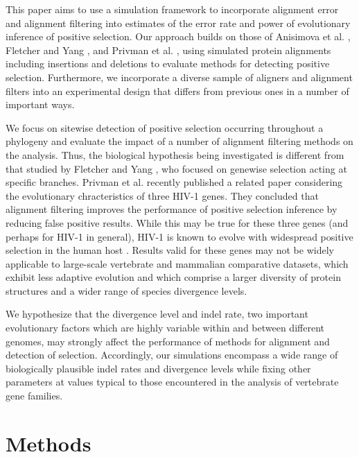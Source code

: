 \documentclass{article}
\begin{document}
This paper aims to use a simulation framework to incorporate alignment
error and alignment filtering into estimates of the error rate and
power of \sw evolutionary inference of positive selection. Our
approach builds on those of Anisimova et al.
\citeyearpar{Anisimova2002Accuracy}, Fletcher and Yang
\citeyearpar{Fletcher2010Effect}, and Privman et
al. \citeyearpar{Privman2011Improving}, using simulated protein
alignments including insertions and deletions to evaluate methods for
detecting \sw positive selection. Furthermore, we incorporate a
diverse sample of aligners and alignment filters into an experimental
design that differs from previous ones in a number of important ways.

We focus on sitewise detection of positive selection occurring
throughout a phylogeny and evaluate the impact of a number of
alignment filtering methods on the \sw analysis. Thus, the biological
hypothesis being investigated is different from that studied by
Fletcher and Yang \citeyearpar{Fletcher2010Effect}, who focused on
genewise selection acting at specific branches.  Privman et
al. \citeyearpar{Privman2011Improving} recently published a related
paper considering the evolutionary chracteristics of three HIV-1
genes. They concluded that alignment filtering improves the
performance of positive selection inference by reducing false positive
results. While this may be true for these three genes (and perhaps for
HIV-1 in general), HIV-1 is known to evolve with widespread positive
selection in the human host \citep{Yang2003Widespread}. Results valid
for these genes may not be widely applicable to large-scale vertebrate
and mammalian comparative datasets, which exhibit less adaptive
evolution \citep{Kosiol2008Patterns} and which comprise a larger
diversity of protein structures and a wider range of species
divergence levels.

We hypothesize that the divergence level and indel rate, two important
evolutionary factors which are highly variable within and between
different genomes, may strongly affect the performance of methods for
alignment and detection of selection. Accordingly, our simulations
encompass a wide range of biologically plausible indel rates and
divergence levels while fixing other parameters at values typical to
those encountered in the \sw analysis of vertebrate gene families.

\section*{Methods}
\end{document}
